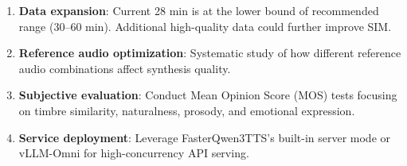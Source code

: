 \documentclass{ar-1col}
\begin{document}
\begin{enumerate}
    \item \textbf{Data expansion}: Current 28 min is at the lower bound of recommended range (30--60 min). Additional high-quality data could further improve SIM.
    \item \textbf{Reference audio optimization}: Systematic study of how different reference audio combinations affect synthesis quality.
    \item \textbf{Subjective evaluation}: Conduct Mean Opinion Score (MOS) tests focusing on timbre similarity, naturalness, prosody, and emotional expression.
    \item \textbf{Service deployment}: Leverage FasterQwen3TTS's built-in server mode or vLLM-Omni for high-concurrency API serving.
\end{enumerate}
\end{document}
